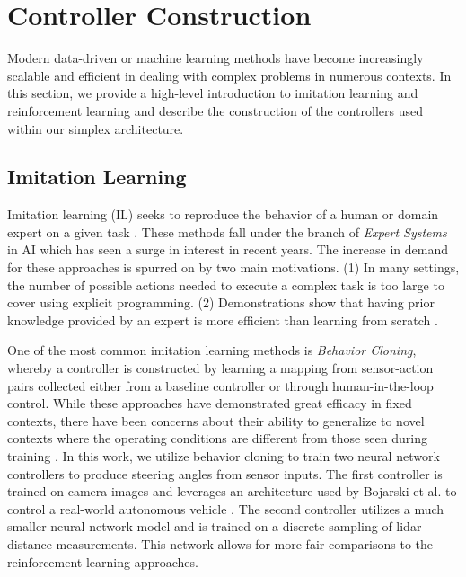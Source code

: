 \documentclass[manuscript,screen,review]{acmart}
\newcommand{\todo}[1]{\textcolor{red}{\textbf{\underline{TODO:}} #1}}
\begin{document}
\section{Controller Construction}

Modern data-driven or machine learning methods have become increasingly scalable and efficient in dealing with complex problems in numerous contexts. In this section, we provide a high-level introduction to imitation learning and reinforcement learning and describe the construction of the controllers used within our simplex architecture.

\subsection{Imitation Learning}

Imitation learning (IL) seeks to reproduce the behavior of a human or domain expert on a given task \cite{Hussein2017ImitationL}. These methods fall under the branch of \textit{Expert Systems} in AI which has seen a surge in interest in recent years. The increase in demand for these approaches is spurred on by two main motivations. (1) In many settings, the number of possible actions needed to execute a complex task is too large to cover using explicit programming. (2) Demonstrations show that having prior knowledge provided by an expert is more efficient than learning from scratch \cite{Hussein2017ImitationL}.

One of the most common imitation learning methods is \textit{Behavior Cloning}, whereby a controller is constructed by learning a mapping from sensor-action pairs collected either from a baseline controller or through human-in-the-loop control. While these approaches have demonstrated great efficacy in fixed contexts, there have been concerns about their ability to generalize to novel contexts where the operating conditions are different from those seen during training \cite{Majumdar2017}.
In this work, we utilize behavior cloning to train two neural network controllers to produce steering angles from sensor inputs. The first controller is trained on camera-images and leverages an architecture used by Bojarski et al. to control a real-world autonomous vehicle \cite{bojarski2016end}. The second controller utilizes a much smaller neural network model and is trained on a discrete sampling of lidar distance measurements. This network allows for more fair comparisons to the reinforcement learning approaches. %
\end{document}
